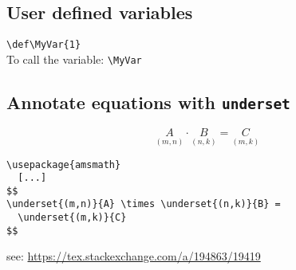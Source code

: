 \subsection{User defined variables}
\verb|\def\MyVar{1}|\\
To call the variable: \verb|\MyVar|

\subsection{Annotate equations with \texttt{underset}}
$$
\underset{(m,n)}{A} \cdot \underset{(n,k)}{B} =
  \underset{(m,k)}{C}
$$
\begin{verbatim}
\usepackage{amsmath}
  [...]
$$
\underset{(m,n)}{A} \times \underset{(n,k)}{B} =
  \underset{(m,k)}{C}
$$
\end{verbatim}
see: \url{https://tex.stackexchange.com/a/194863/19419}
